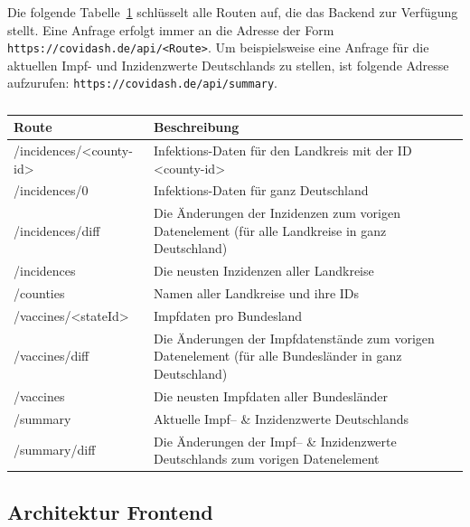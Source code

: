\documentclass[conference]{IEEEtran}
\begin{document}
Die folgende Tabelle~\ref{tab:routen} schlüsselt alle Routen auf, die das Backend zur Verfügung stellt. Eine Anfrage erfolgt immer an die Adresse der Form \texttt{https://covidash.de/api/<Route>}.
\newline
Um beispielsweise eine Anfrage für die aktuellen Impf- und Inzidenzwerte Deutschlands zu stellen, ist folgende Adresse aufzurufen: \texttt{https://covidash.de/api/summary}.
\begin{table}[h!]%
    \centering%
    \def\arraystretch{1.5}%
    \caption{}%
    \label{tab:routen}%
    \begin{tabular*}{\columnwidth}{@{ }p{}@{ }p{}}%
        \textbf{Route} & \textbf{Beschreibung}\\
        \hline
        \hline
        /incidences/<county-id> & Infektions-Daten für den Landkreis mit der ID <county-id>\\
        \hline
        /incidences/0           & Infektions-Daten für ganz Deutschland\\
        \hline
        /incidences/diff        & Die Änderungen der Inzidenzen zum vorigen Datenelement (für alle Landkreise in ganz Deutschland)\\
        \hline
        /incidences             & Die neusten Inzidenzen aller Landkreise\\
        \hline
        /counties               & Namen aller Landkreise und ihre IDs\\
        \hline
        /vaccines/<stateId>     & Impfdaten pro Bundesland\\
        \hline
        /vaccines/diff          & Die Änderungen der Impfdatenstände zum vorigen Datenelement (für alle Bundesländer in ganz Deutschland)\\
        \hline
        /vaccines               & Die neusten Impfdaten aller Bundesländer\\
        \hline
        /summary                & Aktuelle Impf-- \& Inzidenzwerte Deutschlands\\
        \hline
        /summary/diff           & Die Änderungen der Impf-- \& Inzidenzwerte Deutschlands zum vorigen Datenelement
    \end{tabular*}
    \vspace{0.1cm}
\end{table}



\subsection{Architektur Frontend}
\end{document}

